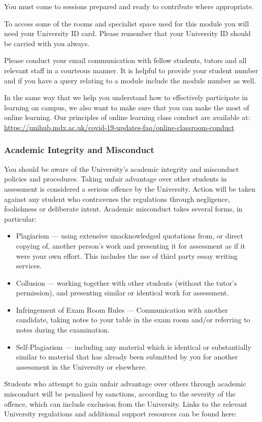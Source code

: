 \documentclass{MDXHandbook}
\begin{document}
You must come to sessions prepared and ready to contribute where appropriate.   

To access some of the rooms and specialist space used for this module you will need your University ID card. Please remember that your University ID should be carried with you always. 

Please conduct your email communication with fellow students, tutors and all relevant staff in a courteous manner. It is helpful to provide your student number and if you have a query relating to a module include the module number as well.  

In the same way that we help you understand how to effectively participate in learning on campus, we also want to make sure that you can make the most of online learning. Our principles of online learning class conduct are available at:
\url{https://unihub.mdx.ac.uk/covid-19-updates-faq/online-classroom-conduct}

\subsubsection*{Academic Integrity and Misconduct}
You should be aware of the University’s academic integrity and misconduct policies and procedures. Taking unfair advantage over other students in assessment is considered a serious offence by the University. Action will be taken against any student who contravenes the regulations through negligence, foolishness or deliberate intent. Academic misconduct takes several forms, in particular:  
\begin{itemize}
	\item Plagiarism --- using extensive unacknowledged quotations from, or direct copying of, another person’s work and presenting it for assessment as if it were your own effort. This includes the use of third party essay writing services. 
	\item Collusion --- working together with other students (without the tutor’s permission), and presenting similar or identical work for assessment. 
	\item Infringement of Exam Room Rules --- Communication with another candidate, taking notes to your table in the exam room and/or referring to notes during the examination. 
	\item Self-Plagiarism --- including any material which is identical or substantially similar to material that has already been submitted by you for another assessment in the University or elsewhere.
\end{itemize}
Students who attempt to gain unfair advantage over others through academic misconduct  will be penalised by sanctions, according to the severity of the offence, which can include exclusion from the University. Links to the relevant University regulations and additional support resources can be found here:
\end{document}
